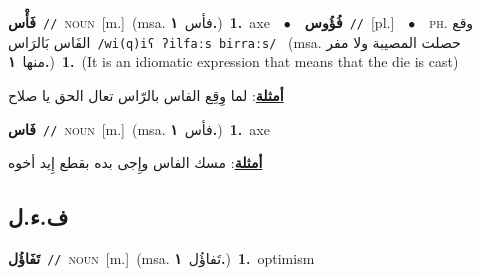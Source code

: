 \documentclass[10pt,a4paper,twoside]{article} %
\begin{document}
\begin{multicols}{2}
{\setlength\topsep{0pt}\textbf{\foreignlanguage{arabic}{فَأْس}}\ {\color{gray}\texttt{//}\color{black}}\ \textsc{noun}\ [m.]\ \color{gray}(msa. \foreignlanguage{arabic}{فأس}~\foreignlanguage{arabic}{\textbf{١.}})\color{black}\ \textbf{1.}~axe\ \ $\bullet$\ \ \setlength\topsep{0pt}\textbf{\foreignlanguage{arabic}{فُؤُوس}}\ {\color{gray}\texttt{//}\color{black}}\ [pl.]\ \ $\bullet$\ \ \textsc{ph.} \color{gray} \foreignlanguage{arabic}{وقع الفَاس بَالرَاس}\color{black}\ {\color{gray}\texttt{/{\sffamily wi(q)iʕ ʔilfaːs birraːs}/}\color{black}}\ \color{gray} (msa. \foreignlanguage{arabic}{حصلت المصيبة ولا مفر منها}~\foreignlanguage{arabic}{\textbf{١.}})\color{black}\ \textbf{1.}~(It is an idiomatic expression that means that the die is cast)\  \begin{flushright}\color{gray}\foreignlanguage{arabic}{\textbf{\underline{\foreignlanguage{arabic}{أمثلة}}}: لما وِقِع الفاس بالرّاس تعال الحق يا صلاح}\end{flushright}\color{black}} \vspace{2mm}

{\setlength\topsep{0pt}\textbf{\foreignlanguage{arabic}{فَاس}}\ {\color{gray}\texttt{//}\color{black}}\ \textsc{noun}\ [m.]\ \color{gray}(msa. \foreignlanguage{arabic}{فأس}~\foreignlanguage{arabic}{\textbf{١.}})\color{black}\ \textbf{1.}~axe\  \begin{flushright}\color{gray}\foreignlanguage{arabic}{\textbf{\underline{\foreignlanguage{arabic}{أمثلة}}}: مسك الفاس وإِجى بده بقطع إِيد أخوه}\end{flushright}\color{black}} \vspace{2mm}

\vspace{-3mm}
\subsection*{\color{blue}\foreignlanguage{arabic}{ف.ء.ل}\color{blue}{}} 

{\setlength\topsep{0pt}\textbf{\foreignlanguage{arabic}{تَفَاؤُل}}\ {\color{gray}\texttt{//}\color{black}}\ \textsc{noun}\ [m.]\ \color{gray}(msa. \foreignlanguage{arabic}{تَفاؤُل}~\foreignlanguage{arabic}{\textbf{١.}})\color{black}\ \textbf{1.}~optimism\ } \vspace{2mm}


\end{multicols}
\end{document}
